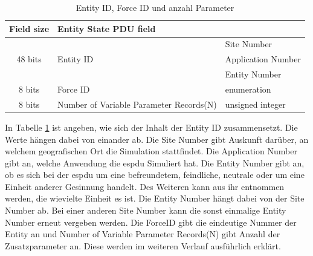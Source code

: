 \begin{table}[H]
	\begin{tabular}{|c|l|l|}
		\hline
		Field size             & \multicolumn{2}{l|}{Entity State PDU field}                  \\ \hline
		\multirow{3}{*}{48 bits}    & \multirow{3}{*}{Entity ID}              & Site Number        \\ \cline{3-3} 
		&                                         & Application Number \\ \cline{3-3} 
		&                                         & Entity Number      \\ \hline
		8 bits                      & Force ID                                & enumeration        \\ \hline
		8 bits                     & Number of Variable Parameter Records(N) & unsigned integer   \\ \hline
	
	\end{tabular}
\caption[Entity ID, Force ID und anzahl Parameter]{Entity ID, Force ID und anzahl Parameter\cite{SISOStandardsActivityCommitteeoftheIEEEComputerSociety.}}
\label{ids}
\end{table}
In Tabelle \ref{ids} ist angeben, wie sich der Inhalt der Entity ID zusammensetzt.
Die Werte hängen dabei von einander ab. Die  \glqq Site Number\grqq{} gibt Auskunft darüber, an welchem geografischen Ort die Simulation stattfindet.
Die \glqq Application Number\grqq{} gibt an, welche Anwendung die \ac{espdu} Simuliert hat. Die \glqq Entity Number\grqq{} gibt an, ob es sich bei der \ac{espdu} um eine befreundetem, feindliche, neutrale oder um eine Einheit anderer Gesinnung handelt. Des Weiteren kann aus ihr entnommen werden, die wievielte Einheit es ist. Die \glqq Entity Number\grqq{} hängt dabei von der \glqq Site Number\grqq{} ab. Bei einer anderen \glqq Site Number\grqq{} kann die sonst einmalige \glqq Entity Number\grqq{} erneut vergeben werden. Die \glqq ForceID\grqq{} gibt die eindeutige Nummer der Entity an und \glqq Number of Variable Parameter Records(N)\grqq{} gibt Anzahl der Zusatzparameter an. Diese werden im weiteren Verlauf ausführlich erklärt. 



